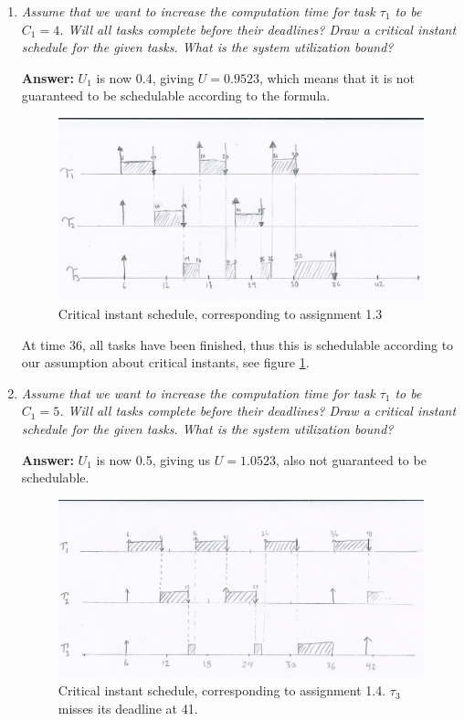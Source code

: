 \documentclass[a4paper,10pt]{article}
\newcommand{\answer}{\textbf{Answer: }}
\begin{document}
\begin{enumerate}
	\item \emph{Assume that we want to increase the computation time for task $\tau_1$ to be $C_1 = 4$. Will all tasks complete before their deadlines? Draw a critical instant schedule for the given tasks. What is the system utilization bound?}
	
	\answer $U_1$ is now 0.4, giving $U = 0.9523$, which means that it is not guaranteed to be schedulable according to the formula.

	\begin{figure}
	\includegraphics[scale=0.4]{1_3_low}
	\caption{Critical instant schedule, corresponding to assignment 1.3}
	\label{1_3}
	\end{figure}

	At time 36, all tasks have been finished, thus this is schedulable according to our assumption about critical instants, see figure \ref{1_3}.
	
	\item \emph{Assume that we want to increase the computation time for task $\tau_1$ to be $C_1 = 5$. Will all tasks complete before their deadlines? Draw a critical instant schedule for the given tasks. What is the system utilization bound?}
	
	\answer $U_1$ is now 0.5, giving us $U = 1.0523$, also not guaranteed to be schedulable.
	
	\begin{figure}
	\includegraphics[scale=0.4]{1_4_low}
	\caption{Critical instant schedule, corresponding to assignment 1.4. $\tau_3$ misses its deadline at 41.}
	\label{1_4}
	\end{figure}
	

\end{enumerate}
\end{document}
